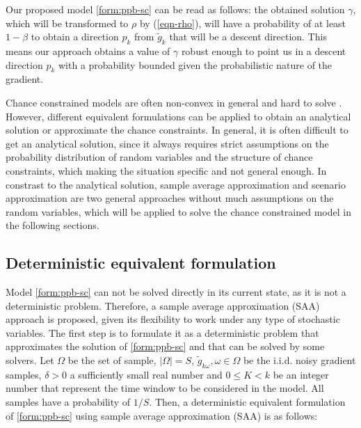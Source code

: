 \documentclass[11pt,twoside]{article}
\def\AFcomment#1{{\color{red}\emph{AF: #1}}}
\begin{document}

Our proposed model \eqref{form:ppb-sc} can be read as follows: the
obtained solution $\gamma$, which will be transformed to $\rho$ by
(\ref{eqn-rho}), will have a probability of at least $1-\beta$ to
obtain a direction $p_k$ from $\tilde{g}_k$ that will be a descent
direction. This means our approach obtains a value of $\gamma$ robust
enough to point us in a descent direction $p_k$ with a probability
bounded given the probabilistic nature of the gradient.

Chance constrained models are often non-convex in general and hard to
solve \cite{SDR14}. However, different equivalent formulations can be
applied to obtain an analytical solution or approximate the chance
constraints.
In general, it is often difficult to get an analytical solution, since it always requires strict assumptions on the probability distribution of random variables and the structure of chance constraints, which making the situation specific and not general enough.
In constrast to the analytical solution, sample average approximation and scenario approximation are two general approaches without much assumptions on the random variables, which will be applied to solve the chance constrained model in the following sections.


\subsection{Deterministic equivalent formulation}

Model \eqref{form:ppb-sc} can not be solved directly in its current state, as it is not a deterministic problem.
Therefore, a sample average approximation (SAA) approach is proposed, given its flexibility to work under any type of stochastic variables. The first step is to formulate it as a deterministic problem that approximates the solution of \eqref{form:ppb-sc} and that can be solved by some solvers. Let $\Omega$ be the set of sample, $|\Omega|=S$, $\tilde{g}_{k\omega}, \omega \in \Omega$ be the i.i.d. noisy gradient samples, $\delta>0$ a sufficiently small real number and $0 \le K < k$ be an integer number that represent the time window to be considered in the model. All samples have a probability of $1/S$. Then, a deterministic equivalent formulation of \eqref{form:ppb-sc} using sample average approximation (SAA) is as follows:
\end{document}
